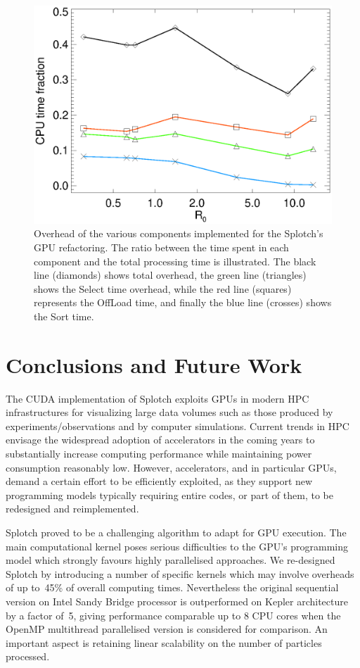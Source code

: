 \documentclass[preprint,5pt]{elsarticle}
\begin{document}
\begin{figure}
\includegraphics[scale=0.5]{overheadsK20-fig9.eps}
\caption{Overhead of the various components implemented for the Splotch's
GPU refactoring. The ratio between the time spent in each component and the total processing 
time is illustrated. The black line (diamonds) shows total overhead, the green line (triangles) shows the Select time overhead, while the red line (squares) represents the OffLoad time, and finally the blue line (crosses) shows the Sort time.}
\label{fig:over}
\end{figure}

\section{Conclusions and Future Work}
\label{sec:conclusions}
The CUDA implementation of Splotch exploits GPUs in modern HPC infrastructures for visualizing large data volumes such as those produced by experiments/observations and by computer simulations. Current trends in HPC envisage the widespread adoption of accelerators in the coming years to substantially increase computing performance while maintaining power consumption reasonably low. However, accelerators, and in particular GPUs, demand a certain effort to be efficiently exploited, as they support new programming models typically requiring entire codes, or part of them, to be redesigned and reimplemented.

Splotch proved to be a challenging algorithm to adapt for GPU execution. The main computational kernel poses serious difficulties to the GPU's programming model which strongly favours highly parallelised approaches. We re-designed Splotch by introducing a number of specific kernels which may involve overheads of up to~45\% of overall computing times. Nevertheless the original sequential 
version on Intel Sandy Bridge processor is outperformed on Kepler architecture by a factor of~5, giving performance comparable up to 8 CPU cores when the OpenMP multithread parallelised version is considered for comparison. An important aspect is retaining linear scalability on the number of particles processed.
\end{document}
